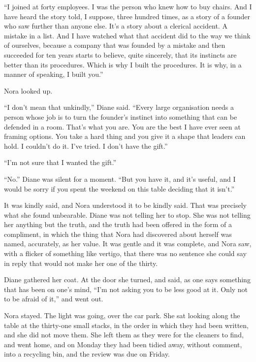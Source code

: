``I joined at forty employees. I was the person who knew how to buy chairs. And I have heard the story told, I suppose, three hundred times, as a story of a founder who saw further than anyone else. It's a story about a clerical accident. A mistake in a list. And I have watched what that accident did to the way we think of ourselves, because a company that was founded by a mistake and then succeeded for ten years starts to believe, quite sincerely, that its instincts are better than its procedures. Which is why I built the procedures. It is why, in a manner of speaking, I built you.''

Nora looked up.

``I don't mean that unkindly,'' Diane said. ``Every large organisation needs a person whose job is to turn the founder's instinct into something that can be defended in a room. That's what you are. You are the best I have ever seen at framing options. You take a hard thing and you give it a shape that leaders can hold. I couldn't do it. I've tried. I don't have the gift.''

``I'm not sure that I wanted the gift.''

``No.'' Diane was silent for a moment. ``But you have it, and it's useful, and I would be sorry if you spent the weekend on this table deciding that it isn't.''

It was kindly said, and Nora understood it to be kindly said. That was precisely what she found unbearable. Diane was not telling her to stop. She was not telling her anything but the truth, and the truth had been offered in the form of a compliment, in which the thing that Nora had discovered about herself was named, accurately, as her value. It was gentle and it was complete, and Nora saw, with a flicker of something like vertigo, that there was no sentence she could say in reply that would not make her one of the thirty.

Diane gathered her coat. At the door she turned, and said, as one says something that has been on one's mind, ``I'm not asking you to be less good at it. Only not to be afraid of it,'' and went out.

Nora stayed. The light was going, over the car park. She sat looking along the table at the thirty-one small stacks, in the order in which they had been written, and she did not move them. She left them as they were for the cleaners to find, and went home, and on Monday they had been tidied away, without comment, into a recycling bin, and the review was due on Friday.

